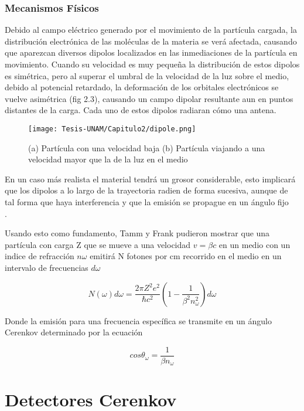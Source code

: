 \subsubsection{Mecanismos Físicos}
Debido al campo eléctrico generado por el movimiento de la partícula cargada, la distribución electrónica de las moléculas de la materia se verá afectada, causando que aparezcan diversos dipolos localizados en las inmediaciones de la partícula en movimiento\cite{Beyer, Jelley}. Cuando su velocidad es muy pequeña la distribución de estos dipolos es simétrica, pero al superar el umbral de la velocidad de la luz sobre el medio, debido al potencial retardado, la deformación de los orbitales electrónicos se vuelve asimétrica (fig 2.3), causando un campo dipolar resultante aun en puntos distantes de la carga. Cada uno de estos dipolos radiaran cómo una antena\cite{Beyer, Jelley}.\\

\begin{figure}[h!]
    \centering
    \texttt{[image: Tesis-UNAM/Capitulo2/dipole.png]}
    \caption{(a) Partícula con una velocidad baja (b) Partícula viajando a una velocidad mayor que la de la luz en el medio}
    \label{fig:enter-label}
\end{figure}

En un caso más realista el material tendrá un grosor considerable, esto implicará que los dipolos a lo largo de la trayectoria radien de forma sucesiva, aunque de tal forma que haya interferencia y que la emisión se propague en un ángulo fijo\cite{Jelley, Beyer}\\.

Usando esto como fundamento, Tamm y Frank pudieron mostrar\cite{Bashmakov_2015, Jelley, Beyer} que una partícula con carga Z que se mueve a una velocidad $v = \beta c$ en un medio con un indice de refracción $n\omega$ emitirá N fotones por cm recorrido en el medio en un intervalo de frecuencias $d\omega$

$$N(\omega)d\omega = \frac{2\pi Z^2 e^2}{\hbar c^2}\left(1 - \frac{1}{\beta^2n_\omega^2} \right)d\omega$$

Donde la emisión para una frecuencia específica se transmite en un ángulo Cerenkov determinado por la ecuación \cite{Bashmakov_2015, Jelley}

\begin{equation}
    cos\theta_\omega = \frac{1}{\beta n_\omega}
\end{equation}


\section{Detectores Cerenkov}

